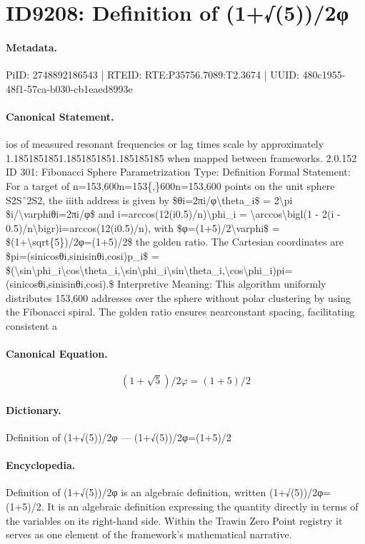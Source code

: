 \section*{ID9208: Definition of (1+√(5))/2φ}
\paragraph{Metadata.}
PiID: 2748892186543 | RTEID: RTE:P35756.7089:T2.3674 | UUID: 480c1955-48f1-57ca-b030-cb1eaed8993e

\paragraph{Canonical Statement.}
ios of measured resonant frequencies or lag times scale by approximately 1.1851851851.1851851851.185185185 when mapped between frameworks. 2.0.152 ID 301: Fibonacci Sphere Parametrization Type: Definition Formal Statement: For a target of n=153,600n=153\{,\}600n=153,600 points on the unit sphere S2Sˆ2S2, the iiith address is given by \$θi=2πi/φ\textbackslash{}theta\_i\$ = 2\textbackslash{}pi \$i/\textbackslash{}varphiθi=2πi/φ\$ and i=arccos(12(i0.5)/n)\textbackslash{}phi\_i = \textbackslash{}arccos\textbackslash{}bigl(1 - 2(i - 0.5)/n\textbackslash{}bigr)i=arccos(12(i0.5)/n), with \$φ=(1+5)/2\textbackslash{}varphi\$ = \$(1+\textbackslash{}sqrt\{5\})/2φ=(1+5)/2\$ the golden ratio. The Cartesian coordinates are \$pi=(sinicosθi,sinisinθi,cosi)p\_i\$ = \$(\textbackslash{}sin\textbackslash{}phi\_i\textbackslash{}cos\textbackslash{}theta\_i,\textbackslash{}sin\textbackslash{}phi\_i\textbackslash{}sin\textbackslash{}theta\_i,\textbackslash{}cos\textbackslash{}phi\_i)pi=(sinicosθi,sinisinθi,cosi).\$ Interpretive Meaning: This algorithm uniformly distributes 153,600 addresses over the sphere without polar clustering by using the Fibonacci spiral. The golden ratio ensures nearconstant spacing, facilitating consistent a

\paragraph{Canonical Equation.}
\[
(1+\sqrt{5})/2φ=(1+5)/2
\]

\paragraph{Dictionary.}
Definition of (1+√(5))/2φ — (1+√(5))/2φ=(1+5)/2

\paragraph{Encyclopedia.}
Definition of (1+√(5))/2φ is an algebraic definition, written (1+√(5))/2φ=(1+5)/2. It is an algebraic definition expressing the quantity directly in terms of the variables on its right-hand side. Within the Trawin Zero Point registry it serves as one element of the framework's mathematical narrative.
